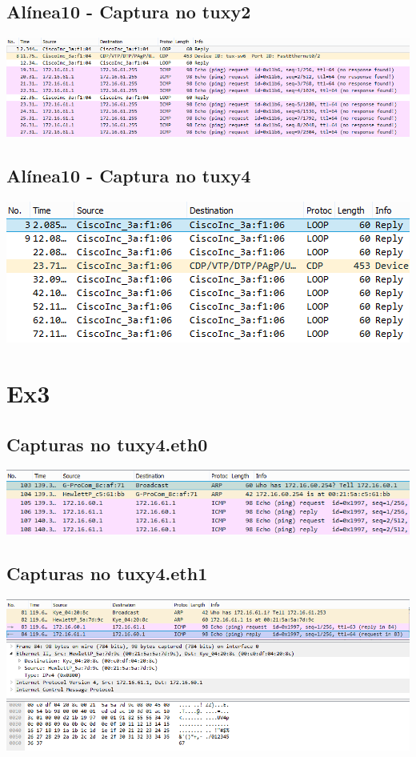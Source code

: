\documentclass[11pt,a4paper,reqno]{report}
\numberwithin{equation}{section}
\begin{document}
\begin{appendices}
\subsection{Alínea10 - Captura no tuxy2}
\includegraphics[width=18cm]{ex2_a10_tux2.png}
\subsection{Alínea10 - Captura no tuxy4}
\includegraphics[width=18cm]{ex2_a10_tux4.png}

\section{Ex3}%

\subsection{Capturas no tuxy4.eth0}
\label{ex3_eth0}
\includegraphics[width=18cm]{ex3_tux4eth0_ARP.png}

\subsection{Capturas no tuxy4.eth1}
\label{ex3_eth1}
\includegraphics[width=18cm]{ex3_tux4eth1_pingdetailed.png}


\end{appendices}
\end{document}
